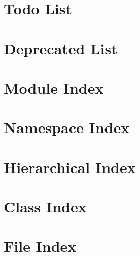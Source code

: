 \documentclass[twoside]{book}
\newcommand{\+}{\discretionary{\mbox{\scriptsize$\hookleftarrow$}}{}{}}
\begin{document}
\chapter{Todo List}
\label{todo}

\chapter{Deprecated List}
\label{deprecated}

\chapter{Module Index}

\chapter{Namespace Index}

\chapter{Hierarchical Index}

\chapter{Class Index}

\chapter{File Index}

\end{document}
